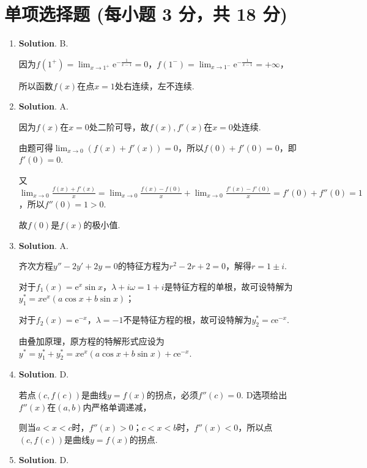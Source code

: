 \documentclass[../Main.tex]{subfiles}
\begin{document}
\section{单项选择题 (每小题 3 分，共 18 分)}
\begin{enumerate}
    \item \textbf{Solution}. B.

          因为$f(1^{+})=\lim_{x\to1^+}\mathrm{e}^{-\frac{1}{x-1}}=0$，$f(1^{-})=\lim_{x\to1^-}
              \mathrm{e}^{-\frac{1}{x-1}}=+\infty$，

          所以函数$f(x)$在点$x=1$处右连续，左不连续.

    \item \textbf{Solution}. A.

          因为$f(x)$在$x=0$处二阶可导，故$f(x),f'(x)$在$x=0$处连续.

          由题可得$\lim_{x\to0}(f(x)+f'(x))=0$，所以$f(0)+f'(0)=0$，即$f'(0)=0$.

          又$\lim_{x\to0}\frac{f(x)+f'(x)}{x}=\lim_{x\to0}\frac{f(x)-f(0)}{x}+\lim_{x\to0}
              \frac{f'(x)-f'(0)}{x}=f'(0)+f''(0)=1$，所以$f''(0)=1>0$.

          故$f(0)$是$f(x)$的极小值.

    \item \textbf{Solution}. A.

          齐次方程$y''-2y'+2y=0$的特征方程为$r^{2}-2r+2=0$，解得$r=1\pm i$.

          对于$f_{1}(x)=\mathrm{e}^{x}\sin x$，$\lambda+i\omega = 1+i$是特征方程的单根，故可设特解为$y
                  _{1}^{*}=x\mathrm{e}^{x}(a\cos x+b\sin x)$；

          对于$f_{2}(x)=\mathrm{e}^{-x}$，$\lambda = -1$不是特征方程的根，故可设特解为$y
                  _{2}^{*}=c\mathrm{e}^{-x}$.

          由叠加原理，原方程的特解形式应设为$y^{*}=y_{1}^{*}+y_{2}^{*}=x\mathrm{e}^{x}
              (a\cos x+b\sin x)+c\mathrm{e}^{-x}$.

    \item \textbf{Solution}. D.

          若点$(c,f(c))$是曲线$y=f(x)$的拐点，必须$f''(c)=0$. D选项给出$f''(x)$在$(a,
              b)$内严格单调递减，

          则当$a<x<c$时，$f''(x)>0$；$c<x<b$时，$f''(x)<0$，所以点$(c,f(c))$是曲线$y=
              f(x)$的拐点.

    \item \textbf{Solution}. D.


\end{enumerate}
\end{document}
